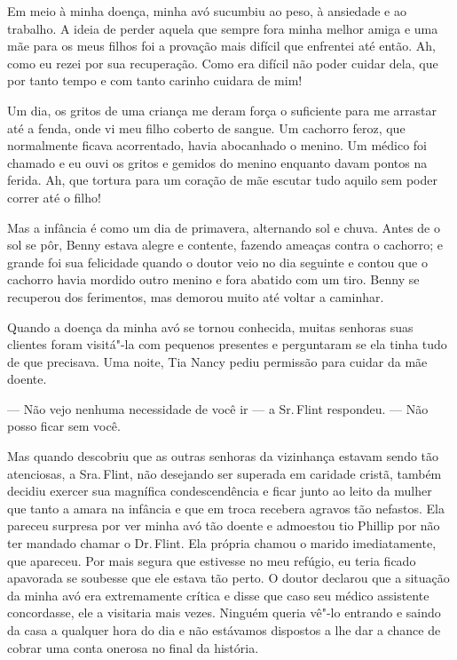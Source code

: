 Em meio à minha doença, minha avó
sucumbiu ao peso, à ansiedade e ao trabalho. A ideia de perder aquela
que sempre fora minha melhor amiga e uma mãe para os meus filhos foi a
provação mais difícil que enfrentei até então. Ah, como eu rezei por sua
recuperação. Como era difícil não poder cuidar dela, que por tanto tempo
e com tanto carinho cuidara de mim!

Um dia, os gritos de uma criança me
deram força o suficiente para me arrastar até a fenda, onde vi meu filho
coberto de sangue. Um cachorro feroz, que normalmente ficava
acorrentado, havia abocanhado o menino. Um médico foi chamado e eu ouvi
os gritos e gemidos do menino enquanto davam pontos na ferida. Ah, que
tortura para um coração de mãe escutar tudo aquilo sem poder correr até
o filho!

Mas a infância é como um dia de
primavera, alternando sol e chuva. Antes de o sol se pôr, Benny estava
alegre e contente, fazendo ameaças contra o cachorro; e grande foi sua
felicidade quando o doutor veio no dia seguinte e contou que o cachorro
havia mordido outro menino e fora abatido com um tiro. Benny se
recuperou dos ferimentos, mas demorou muito até voltar a caminhar.

Quando a doença da minha avó se tornou
conhecida, muitas senhoras suas clientes foram visitá"-la com pequenos
presentes e perguntaram se ela tinha tudo de que precisava. Uma noite,
Tia Nancy pediu permissão para cuidar da mãe doente.

--- Não vejo nenhuma necessidade de você ir --- a Sr.\,Flint respondeu.
--- Não posso ficar sem você.

Mas quando descobriu que as outras senhoras da vizinhança estavam sendo
tão atenciosas, a Sra.\,Flint, não desejando ser superada em caridade
cristã, também decidiu exercer sua magnífica condescendência e ficar
junto ao leito da mulher que tanto a amara na infância e que em troca
recebera agravos tão nefastos. Ela pareceu surpresa por ver minha avó
tão doente e admoestou tio Phillip por não ter mandado chamar o Dr.\,Flint. Ela própria chamou o marido imediatamente, que apareceu. Por mais
segura que estivesse no meu refúgio, eu teria ficado apavorada se
soubesse que ele estava tão perto. O doutor declarou que a situação da
minha avó era extremamente crítica e disse que caso seu médico
assistente concordasse, ele a visitaria mais vezes. Ninguém queria vê"-lo
entrando e saindo da casa a qualquer hora do dia e não estávamos
dispostos a lhe dar a chance de cobrar uma conta onerosa no final da
história.

